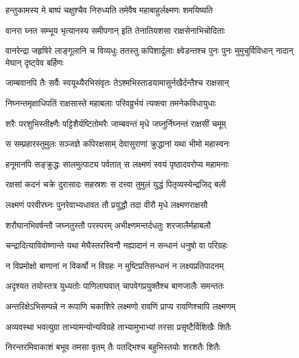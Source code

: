 \twolineshloka
{हन्तुकामस्य मे बाष्पं चक्षुश्चैव निरुध्यति}
{तमेवैष महाबाहुर्लक्ष्मणः शमयिष्यति} %

\twolineshloka
{वानरा घ्नत सम्भूय भृत्यानस्य समीपगान्}
{इति तेनातियशसा राक्षसेनाभिचोदिताः} %

\threelineshloka
{वानरेन्द्रा जहृषिरे लाङ्गूलानि च विव्यधुः}
{ततस्तु कपिशार्दूलाः क्ष्वेडन्तश्च पुनः पुनः}
{मुमुचुर्विविधान् नादान् मेघान् दृष्ट्वेव बर्हिणः} %

\twolineshloka
{जाम्बवानपि तैः सर्वैः स्वयूथ्यैरभिसंवृतः}
{तेऽश्मभिस्ताडयामासुर्नखैर्दन्तैश्च राक्षसान्} %

\twolineshloka
{निघ्नन्तमृक्षाधिपतिं राक्षसास्ते महाबलाः}
{परिवव्रुर्भयं त्यक्त्वा तमनेकविधायुधाः} %

\twolineshloka
{शरैः परशुभिस्तीक्ष्णैः पट्टिशैर्यष्टितोमरैः}
{जाम्बवन्तं मृधे जघ्नुर्निघ्नन्तं राक्षसीं चमूम्} %

\twolineshloka
{स सम्प्रहारस्तुमुलः सञ्जज्ञे कपिरक्षसाम्}
{देवासुराणां क्रुद्धानां यथा भीमो महास्वनः} %

\twolineshloka
{हनूमानपि सङ्क्रुद्धः सालमुत्पाट्य पर्वतात्}
{स लक्ष्मणं स्वयं पृष्ठादवरोप्य महामनाः} %

\twolineshloka
{रक्षसां कदनं चक्रे दुरासादः सहस्रशः}
{स दत्त्वा तुमुलं युद्धं पितृव्यस्येन्द्रजिद् बली} %

\twolineshloka
{लक्ष्मणं परवीरघ्नः पुनरेवाभ्यधावत}
{तौ प्रयुद्धौ तदा वीरौ मृधे लक्ष्मणराक्षसौ} %

\twolineshloka
{शरौघानभिवर्षन्तौ जघ्नतुस्तौ परस्परम्}
{अभीक्ष्णमन्तर्दधतुः शरजालैर्महाबलौ} %

\twolineshloka
{चन्द्रादित्याविवोष्णान्ते यथा मेघैस्तरस्विनौ}
{नह्यादानं न सन्धानं धनुषो वा परिग्रहः} %

\twolineshloka
{न विप्रमोक्षो बाणानां न विकर्षो न विग्रहः}
{न मुष्टिप्रतिसन्धानं न लक्ष्यप्रतिपादनम्} %

\twolineshloka
{अदृश्यत तयोस्तत्र युध्यतोः पाणिलाघवात्}
{चापवेगप्रयुक्तैश्च बाणजालैः समन्ततः} %

\twolineshloka
{अन्तरिक्षेऽभिसम्पन्ने न रूपाणि चकाशिरे}
{लक्ष्मणो रावणिं प्राप्य रावणिश्चापि लक्ष्मणम्} %

\twolineshloka
{अव्यवस्था भवत्युग्रा ताभ्यामन्योन्यविग्रहे}
{ताभ्यामुभाभ्यां तरसा प्रसृष्टैर्विशिखैः शितैः} %

\twolineshloka
{निरन्तरमिवाकाशं बभूव तमसा वृतम्}
{तैः पतद्भिश्च बहुभिस्तयोः शरशतैः शितैः} %

